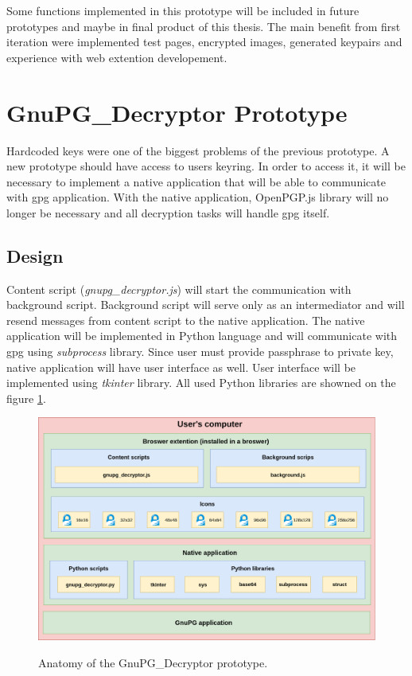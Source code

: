 Some functions implemented in this prototype will be included in future prototypes and maybe in final product of this thesis. The main benefit from first iteration were implemented test pages, encrypted images, generated keypairs and experience with web extention developement.

\section{GnuPG\_Decryptor Prototype}
\label{prototype:GnuPG_Decryptor}
Hardcoded keys were one of the biggest problems of the previous prototype. A new prototype should have access to users keyring. In order to access it, it will be necessary to implement a native application that will be able to communicate with gpg application. With the native application, OpenPGP.js library will no longer be necessary and all decryption tasks will handle gpg itself.

\subsection{Design}
Content script (\textit{gnupg\_decryptor.js}) will start the communication with background script. Background script will serve only as an intermediator and will resend messages from content script to the native application. The native application will be implemented in Python language and will communicate with gpg using \textit{subprocess} library. Since user must provide passphrase to private key, native application will have user interface as well. User interface will be implemented using \textit{tkinter} library. All used Python libraries are showned on the figure \ref{img:gnupg_decryptorAnatomy}.

\begin{figure}[H]
    \begin{center}
        \label{img:gnupg_decryptorAnatomy}
        \includegraphics[width=1.0\textwidth]{obrazky-figures/prototype-GnuPG_Decryptor.png}
        \caption{Anatomy of the GnuPG\_Decryptor prototype.}
    \end{center}
\end{figure}

